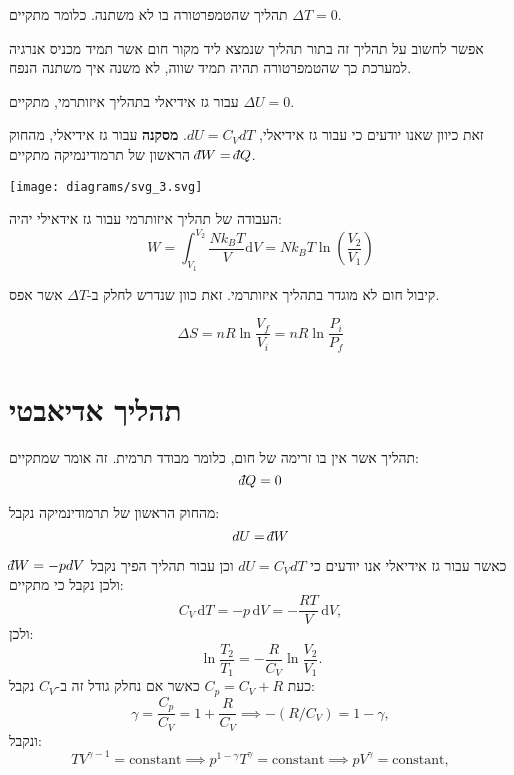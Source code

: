 \documentclass{tstextbook}
\begin{document}
\begin{definition}
תהליך שהטמפרטורה בו לא משתנה. כלומר מתקיים \(\Delta T=0\).

\end{definition}
אפשר לחשוב על תהליך זה בתור תהליך שנמצא ליד מקור חום אשר תמיד מכניס אנרגיה למערכת כך שהטמפרטורה תהיה תמיד שווה, לא משנה איך משתנה הנפח.

\begin{proposition}
עבור גז אידיאלי בתהליך איזותרמי, מתקיים \(\Delta U=0\).

\end{proposition}
זאת כיוון שאנו יודעים כי עבור גז אידיאלי,  \(dU=C_{V}dT\).
\textbf{מסקנה}
עבור גז אידיאלי, מהחוק הראשון של תרמודינמיקה מתקיים \(\;\bar{}\mkern-7.5mu dW=\;\bar{}\mkern-7.5mu dQ\).

\texttt{[image: diagrams/svg\_3.svg]}
\begin{proposition}
העבודה של תהליך איזותרמי עבור גז אידאילי יהיה:
$$W=\int_{V_{1}}^{V_{2}} \frac{Nk_{B}T}{V} \mathrm{d}V=Nk_{B}T\ln\left( \frac{V_{2}}{V_{1}} \right)$$

\end{proposition}
\begin{remark}
קיבול חום לא מוגדר בתהליך איזותרמי. זאת כוון שנדרש לחלק ב-\(\Delta T\) אשר אפס.

\end{remark}
\begin{proposition}
$$\Delta S=n R\ln{\frac{V_{f}}{V_{i}}}=n R\ln{\frac{P_{i}}{P_{f}}}$$

\end{proposition}
\section{תהליך אדיאבטי}

\begin{definition}
תהליך אשר אין בו זרימה של חום, כלומר מבודד תרמית. זה אומר שמתקיים:
$$\;\bar{}\mkern-7.5mu dQ=0$$

\end{definition}
\begin{corollary}
מהחוק הראשון של תרמודינמיקה נקבל:
$$dU=\;\bar{}\mkern-7.5mu dW$$

\end{corollary}
כאשר עבור גז אידיאלי אנו יודעים כי \(dU=C_{V}dT\) וכן עבור תהליך הפיך נקבל \(\;\bar{}\mkern-7.5mu dW=-pdV\) ולכן נקבל כי מתקיים:
$$C_{V}\,\mathrm{d}T=-p\,\mathrm{d}V=-{\frac{R T}{V}}\,\mathrm{d}V,$$
ולכן:
$$\ln\frac{T_{2}}{T_{1}}=-\frac{R}{C_{V}}\ln\frac{V_{2}}{V_{1}}.$$
כעת \(C_{p}=C_{V}+R\) כאשר אם נחלק גודל זה ב-\(C_{V}\) נקבל:
$$\gamma=\frac{C_{p}}{C_{V}}=1+\frac{R}{C_{V}}\implies-(R/C_{V})=1-\gamma,$$
ונקבל:
$$T V^{\gamma-1}={\mathrm{constant}} \implies p^{1-\gamma}T^{\gamma}=\mathrm{constant}\implies p V^{\gamma}={\mathrm{constant}},$$
\end{document}
